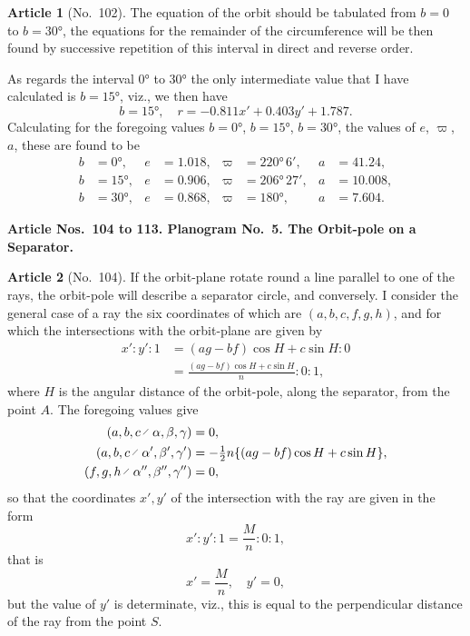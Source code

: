 \documentclass[11pt,a4paper]{article}
\theoremstyle{definition}
\newtheorem{art}{Article}
\begin{document}
\begin{art}[No.~102]
The equation of the orbit should be tabulated from $b = 0$ to $b = 30°$, the equations for the remainder of the circumference will be then found by successive repetition of this interval in direct and reverse order.

As regards the interval $0°$ to $30°$ the only intermediate value that I have calculated is $b = 15°$, viz., we then have
\[
b = 15°, \quad r = -0.811x' + 0.403y' + 1.787.
\]
Calculating for the foregoing values $b = 0°$, $b = 15°$, $b = 30°$, the values of $e$, $\varpi$, $a$, these are found to be
\begin{align*}
b &= 0°, & e &= 1.018, & \varpi &= 220°\, 6', & a &= 41.24,\\
b &= 15°, & e &= 0.906, & \varpi &= 206°\, 27', & a &= 10.008,\\
b &= 30°, & e &= 0.868, & \varpi &= 180°, & a &= 7.604.
\end{align*}
\end{art}

\newpage
\noindent\textbf{Article Nos.~104 to 113. Planogram No.~5. The Orbit-pole on a Separator.}

\begin{art}[No.~104]
If the orbit-plane rotate round a line parallel to one of the rays, the orbit-pole will describe a separator circle, and conversely. I consider the general case of a ray the six coordinates of which are $(a, b, c, f, g, h)$, and for which the intersections with the orbit-plane are given by
\begin{align*}
x' : y' : 1 &= (ag - bf)\cos H + c\sin H : 0\\
&= \frac{(ag - bf)\cos H + c\sin H}{n} : 0 : 1,
\end{align*}
where $H$ is the angular distance of the orbit-pole, along the separator, from the point $A$. The foregoing values give
\begin{align*}
(a, b, c \,\raisebox{.5ex}{$\scriptscriptstyle\diagup$}\, \alpha, \beta, \gamma) &= 0,\\
(a, b, c \,\raisebox{.5ex}{$\scriptscriptstyle\diagup$}\, \alpha', \beta', \gamma') &= -\tfrac{1}{2}n\{(ag - bf)\cos H + c\sin H\},\\
(f, g, h \,\raisebox{.5ex}{$\scriptscriptstyle\diagup$}\, \alpha'', \beta'', \gamma'') &= 0,
\end{align*}
so that the coordinates $x', y'$ of the intersection with the ray are given in the form
\[
x' : y' : 1 = \frac{M}{n} : 0 : 1,
\]
that is
\[
x' = \frac{M}{n}, \quad y' = 0,
\]
but the value of $y'$ is determinate, viz., this is equal to the perpendicular distance of the ray from the point $S$.
\end{art}
\end{document}
